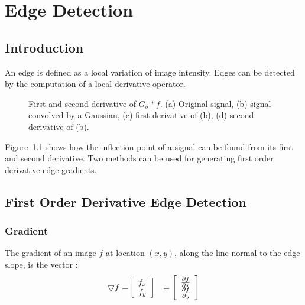 \chapter{\proj Edge Detection}
\label{ch_edge}

\section{Introduction}
An edge is defined as a local variation of image intensity. Edges can
be detected by the computation of a local derivative operator. 

\begin{figure}[htb]
\centerline{
\vbox{
}}
\caption{First and second derivative of  $G_\sigma * f$. (a) Original signal,
(b) signal convolved by a Gaussian, (c) first derivative of (b), (d) second
derivative of (b).}
\label{fig_inflex}
\end{figure}

Figure~\ref{fig_inflex} shows how the inflection point of a signal can be
found from its first and second derivative.
Two methods
can be used for generating first order derivative edge gradients.

\section{First Order Derivative Edge Detection}

\subsection{Gradient}
The gradient of an image $f$ at location $(x,y)$, along the line
normal to the edge slope, is the vector \cite{ima:pratt91,ima:gonzalez93,ima:jain89}:
\begin{eqnarray}
\bigtriangledown f = & 
\left[ \begin{array}{c}
f_x  \\
f_y
\end{array} \right] & = 
\left[ \begin{array}{c}
 \partial f \over \partial x  \\
 \partial f \over \partial y
\end{array} \right]
\end{eqnarray}

